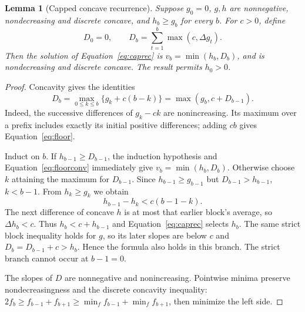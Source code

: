 \documentclass[acmsmall,screen,review,anonymous]{acmart}
\newtheorem{lemma}[theorem]{Lemma}
\begin{document}
\begin{lemma}[Capped concave recurrence]
\label{lem:cap}
Suppose $g_0=0$, $g,h$ are nonnegative, nondecreasing and discrete concave, and $h_b\ge g_b$ for every $b$. For $c>0$, define
\begin{equation}
 D_0=0,\qquad D_b=\sum_{t=1}^b\max(c,\Delta g_t).
 \label{eq:floor}
\end{equation}
Then the solution of Equation~\eqref{eq:caprec} is $v_b=\min(h_b,D_b)$, and is nondecreasing and discrete concave. The result permits $h_0>0$.
\end{lemma}
\begin{proof}
Concavity gives the identities
\begin{equation}
 D_b=\max_{0\le k\le b}\{g_k+c(b-k)\}
     =\max(g_b,c+D_{b-1}).
 \label{eq:floorconv}
\end{equation}
Indeed, the successive differences of $g_k-ck$ are nonincreasing. Its maximum over a prefix includes exactly its initial positive differences; adding $cb$ gives Equation~\eqref{eq:floor}.

Induct on $b$. If $h_{b-1}\ge D_{b-1}$, the induction hypothesis and Equation~\eqref{eq:floorconv} immediately give $v_b=\min(h_b,D_b)$. Otherwise choose $k$ attaining the maximum for $D_{b-1}$. Since $h_{b-1}\ge g_{b-1}$ but $D_{b-1}>h_{b-1}$, $k<b-1$. From $h_k\ge g_k$ we obtain
\[
 h_{b-1}-h_k<c(b-1-k).
\]
The next difference of concave $h$ is at most that earlier block's average, so $\Delta h_b<c$. Thus $h_b<c+h_{b-1}$ and Equation~\eqref{eq:caprec} selects $h_b$. The same strict block inequality holds for $g$, so its later slopes are below $c$ and $D_b=D_{b-1}+c>h_b$. Hence the formula also holds in this branch. The strict branch cannot occur at $b-1=0$.

The slopes of $D$ are nonnegative and nonincreasing. Pointwise minima preserve nondecreasingness and the discrete concavity inequality: $2f_b\ge f_{b-1}+f_{b+1}\ge\min_f f_{b-1}+\min_f f_{b+1}$, then minimize the left side.
\end{proof}
\end{document}
